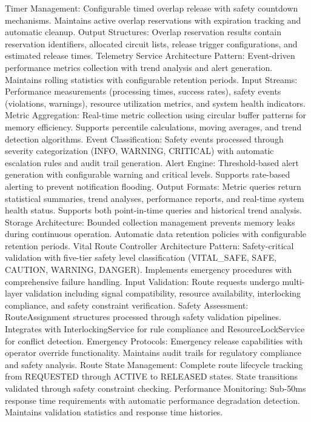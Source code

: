 Timer Management: Configurable timed overlap release with safety countdown mechanisms. Maintains active overlap reservations with expiration tracking and automatic cleanup.
Output Structures: Overlap reservation results contain reservation identifiers, allocated circuit lists, release trigger configurations, and estimated release times.
Telemetry Service
Architecture Pattern: Event-driven performance metrics collection with trend analysis and alert generation. Maintains rolling statistics with configurable retention periods.
Input Streams: Performance measurements (processing times, success rates), safety events (violations, warnings), resource utilization metrics, and system health indicators.
Metric Aggregation: Real-time metric collection using circular buffer patterns for memory efficiency. Supports percentile calculations, moving averages, and trend detection algorithms.
Event Classification: Safety events processed through severity categorization (INFO, WARNING, CRITICAL) with automatic escalation rules and audit trail generation.
Alert Engine: Threshold-based alert generation with configurable warning and critical levels. Supports rate-based alerting to prevent notification flooding.
Output Formats: Metric queries return statistical summaries, trend analyses, performance reports, and real-time system health status. Supports both point-in-time queries and historical trend analysis.
Storage Architecture: Bounded collection management prevents memory leaks during continuous operation. Automatic data retention policies with configurable retention periods.
Vital Route Controller
Architecture Pattern: Safety-critical validation with five-tier safety level classification (VITAL_SAFE, SAFE, CAUTION, WARNING, DANGER). Implements emergency procedures with comprehensive failure handling.
Input Validation: Route requests undergo multi-layer validation including signal compatibility, resource availability, interlocking compliance, and safety constraint verification.
Safety Assessment: RouteAssignment structures processed through safety validation pipelines. Integrates with InterlockingService for rule compliance and ResourceLockService for conflict detection.
Emergency Protocols: Emergency release capabilities with operator override functionality. Maintains audit trails for regulatory compliance and safety analysis.
Route State Management: Complete route lifecycle tracking from REQUESTED through ACTIVE to RELEASED states. State transitions validated through safety constraint checking.
Performance Monitoring: Sub-50ms response time requirements with automatic performance degradation detection. Maintains validation statistics and response time histories.
